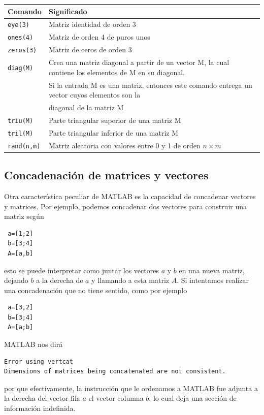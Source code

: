\documentclass[11pt]{article}
\begin{document}
\begin{center}
\begin{tabular}{l|p{}}
\hline
Comando		& Significado \\
\hline
\texttt{eye(3)}		& Matriz identidad de orden 3\\
\hline
\texttt{ones(4)} 	& Matriz de orden 4 de puros unos\\
\hline
\texttt{zeros(3)} 	& Matriz de ceros de orden 3\\
\hline
\texttt{diag(M)} 	& Crea una matriz diagonal a partir de un vector M,
la cual contiene los elementos de M en su diagonal.\\
& Si la entrada M es una matriz, entonces este comando entrega un vector cuyos elementos son la\\
& diagonal de la matriz M\\
\hline
\texttt{triu(M)}& Parte triangular superior  de una matriz M \\
\hline
\texttt{tril(M)}& Parte triangular inferior de una matriz M\\
\hline
\texttt{rand(n,m)}& Matriz aleatoria con valores entre 0 y 1 de orden $n\times m$
\end{tabular}
\end{center}


\subsection{Concadenaci\'on de matrices y vectores}
Otra caracter\'istica peculiar de MATLAB es la capacidad de concadenar vectores y matrices. Por ejemplo, 
podemos concadenar dos vectores para construir una matriz seg\'un
\begin{verbatim}
 a=[1;2]
 b=[3;4]
 A=[a,b]
\end{verbatim}
esto se puede interpretar como juntar los vectores $a$ y $b$ en una nueva matriz, dejando  $b$ a la derecha de $a$ 
y llamando a esta matriz $A$. Si intentamos realizar una concadenaci\'on que no tiene sentido, como por ejemplo
\begin{verbatim}
 a=[3,2]
 b=[3;4]
 A=[a;b]
\end{verbatim}
MATLAB nos dir\'a 
\begin{verbatim}
Error using vertcat
Dimensions of matrices being concatenated are not consistent.
\end{verbatim}
por que efectivamente, la instrucci\'on que le ordenamos a MATLAB fue adjunta a la derecha del vector fila $a$ 
el vector columna $b$, lo cual deja una secci\'on de informaci\'on indefinida.
\end{document}
